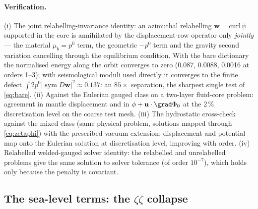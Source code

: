 \documentclass[11pt]{article}
\numberwithin{equation}{section}
\theoremstyle{remark}
\newcommand{\sym}{\operatorname{sym}}
\newcommand{\vu}{\mathbf{u}}
\newcommand{\vw}{\mathbf{w}}
\begin{document}
\paragraph{Verification.} (i) The joint relabelling-invariance identity: an
azimuthal relabelling $\vw = \mathrm{curl}\,\psi$ supported in the core is
annihilated by the displacement-row operator only \emph{jointly} --- the
material $\mu_b = p^0$ term, the geometric $-p^0$ term and the gravity
second variation cancelling through the equilibrium condition. With the
bare dictionary the normalised energy along the orbit converges to zero
(0.087, 0.0088, 0.0016 at orders 1--3); with seismological moduli used
directly it converges to the finite defect $\int2p^0|\sym D\vw|^2\approx
0.137$: an $85\times$ separation, the sharpest single test of
\eqref{eq:bare}. (ii) Against the Eulerian gauged class on a two-layer
fluid-core problem: agreement in mantle displacement and in
$\phi + \vu\cdot\grad\Phi_0$ at the 2\,\% discretisation level on the coarse
test mesh. (iii) The hydrostatic cross-check against the mixed class (same
physical problem, solutions mapped through
\eqref{eq:zetaphi}) with the prescribed
vacuum extension: displacement and potential map onto the Eulerian
solution at discretisation level, improving with order. (iv) Relabelled
welded-gauged solver identity: the relabelled and unrelabelled problems
give the same solution to solver tolerance (of order $10^{-7}$), which
holds only because the penalty is covariant.

\subsection{The sea-level terms: the \texorpdfstring{$\zeta\zeta$}{zeta-zeta} collapse}
\label{sec:ref-sea}
\end{document}
